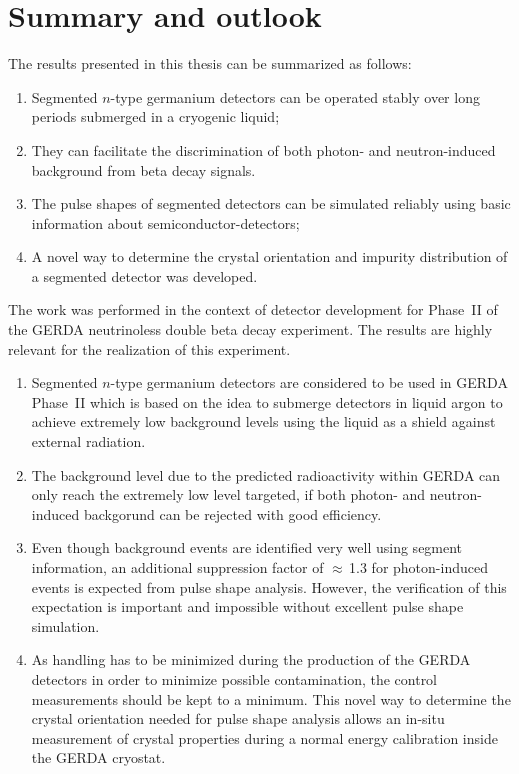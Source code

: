 \chapter{Summary and outlook} 
\label{cha:con} 
 
The results presented in this thesis can be summarized as follows:
\begin{enumerate}
\item Segmented $n$-type germanium detectors can be operated stably
over long periods submerged in a cryogenic liquid;
\item They can facilitate the discrimination of both photon- and
neutron-induced background from beta decay signals.
\item The pulse shapes of segmented detectors can be simulated
reliably using basic information about semiconductor-detectors;
\item A novel way to determine the crystal orientation and impurity
distribution of a segmented detector was developed.
\end{enumerate}

The work was performed in the context of detector development for
Phase~II of the GERDA neutrinoless double beta decay experiment. The
results are highly relevant for the realization of this experiment.

\begin{enumerate}

\item Segmented $n$-type germanium detectors are considered to be used
in GERDA Phase~II which is based on the idea to submerge detectors in
liquid argon to achieve extremely low background levels using the
liquid as a shield against external radiation.
\item The background level due to the predicted radioactivity within
GERDA can only reach the extremely low level targeted, if both
photon- and neutron-induced backgorund can be rejected with good
efficiency.
\item Even though background events are identified very well using
segment information, an additional suppression factor of
$\approx$\,1.3 for photon-induced events is expected from pulse shape
analysis. However, the verification of this expectation is important
and impossible without excellent pulse shape simulation.
\item As handling has to be minimized during the production of the
GERDA detectors in order to minimize possible contamination, the
control measurements should be kept to a minimum. This novel way to
determine the crystal orientation needed for pulse shape analysis
allows an in-situ measurement of crystal properties during a normal
energy calibration inside the GERDA cryostat.
\end{enumerate}

